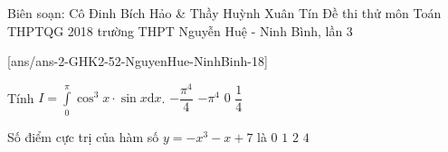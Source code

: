 
\begin{name}
	{Biên soạn: Cô Đinh Bích Hảo \& Thầy Huỳnh Xuân Tín}
	{Đề thi thử môn Toán  THPTQG 2018 trường THPT Nguyễn Huệ - Ninh Bình, lần 3}
\end{name}
\setcounter{ex}{0}\setcounter{bt}{0}
[ans/ans-2-GHK2-52-NguyenHue-NinhBinh-18]
\begin{ex}%
	Tính $I=\displaystyle \int \limits ^{\pi}_0 \cos^3x \cdot \sin x \mathrm{d}x$.
	\choice
	{$-\dfrac{\pi^4}{4}$}
	{$-\pi^4$}
	{\True $0$}
	{ $\dfrac{1}{4}$}
\end{ex}

\begin{ex}%
	Số điểm cực trị của hàm số $y=-x^3-x+7$ là
	\choice
	{\True $0 $}
	{$1$}
	{$2$}
	{$4$}
\end{ex}

